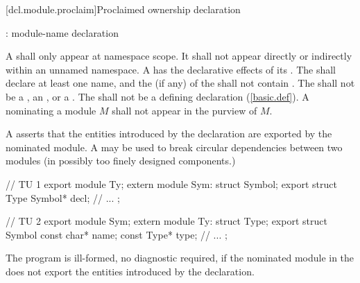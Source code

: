[dcl.module.proclaim]{Proclaimed ownership declaration}%

\begin{std.txt}\color{addclr}
  \begin{bnf}\color{addclr}
    :\br
        module-name \terminal{:} declaration
 \end{bnf}

 \resetalinea[0]
  \alinea
  A  shall only appear
  at namespace scope. 
  It shall not appear directly or indirectly within an unnamed namespace.
  A  has the declarative effects
  of its .
  The  shall declare at 
  least one name, and the  (if any)
  of the  shall not contain .
  The  shall not be a ,
  an ,
   or a .
  The  shall not be a defining declaration
  (\ref{basic.def}).
  A  nominating a module $M$
  shall not appear in the purview of $M$.

  \alinea
  A  asserts that the entities
  introduced by the declaration are exported by the nominated module. 
  \enternote
  A  may be used to break
  circular dependencies between two modules (in possibly too finely
  designed components.)
  \begin{example}
    \begin{codeblock}
    // TU 1
    export module Ty;
    extern module Sym: struct Symbol;
    export struct Type {
      Symbol* decl;
      // ...
    };

    // TU 2
    export module Sym;
    extern module Ty: struct Type;
    export struct Symbol {
      const char* name;
      const Type* type;
      // ...
    };
    \end{codeblock}
  \end{example}
  \exitnote
  
  \alinea 
  The program is ill-formed, no diagnostic required, if the
  nominated module in the  
   does not export the entities
  introduced by the declaration. 
\end{std.txt}


